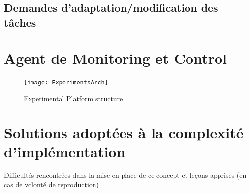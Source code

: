 \documentclass[french, a4paper, 11pt, twoside, pdftex]{StyleThese}
\begin{document}
        \subsection{Demandes d'adaptation/modification des tâches}
    \section{Agent de Monitoring et Control}
            \begin{figure}
                \centering
                \texttt{[image: ExperimentsArch]}
                \caption{Experimental Platform structure\label{fig:expe}}
            \end{figure}
    
    \section{Solutions adoptées à la complexité d'implémentation}
        Difficultés rencontrées dans la mise en place de ce concept et leçons apprises (en cas de volonté de reproduction)

\ifdefined{}
\else


\end{document}
